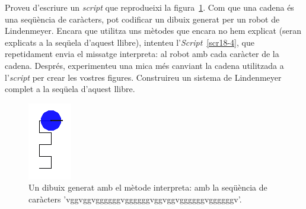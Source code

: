 
Proveu d'escriure un \emph{script} que reprodueixi la figura~\ref{fig1802}. Com que una cadena és una seqüència de caràcters, pot codificar un dibuix generat per un robot de Lindenmeyer. Encara que utilitza uns mètodes que encara no hem explicat (seran explicats a la seqüela d'aquest llibre), intenteu l'\emph{Script}~\ref{scr18-4}, que repetidament envia el missatge \textsf{interpreta:} al robot amb cada caràcter de la cadena. Després, experimenteu una mica més canviant la cadena utilitzada a l'\emph{script} per crear les vostres figures. Construireu un sistema de Lindenmeyer complet a la seqüela d'aquest llibre.
\begin{figure}[h!]
\begin{center}
\includegraphics[scale=1]{Imatges/figura18-2.png}
\end{center}
\caption{Un dibuix generat amb el mètode \textsf{\upshape interpreta:} amb la seqüència de caràcters \textsf{\upshape 'vggvggvggggggvggggggvggvggvggggggvggggggv'}.}
\label{fig1802}
\end{figure}
\newpage
{}

